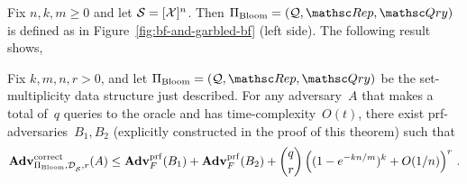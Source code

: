 Fix $n,k,m \geq 0$ and let $\mathcal{S}=[{\cal X}]^n$.  Then $\Pi_{\mathrm{Bloom}}= (\calQ,\Rep, \Qry)$ is defined as in Figure~\ref{fig:bf-and-garbled-bf} (left side).  The following result shows,
\begin{theorem}\label{thm3}
Fix $k,m,n,r>0$, and let $\Pi_{\mathrm{Bloom}}= (\calQ,\Rep, \Qry)$ be the set-multiplicity data structure just described. For any adversary~$A$ that makes a total of~$q$ queries to the oracle and has time-complexity~$O(t)$, there exist prf-adversaries~$B_1,B_2$ (explicitly constructed in the proof of this theorem) such that
\[
\mathrm{\mathbf{Adv}}^{\mathrm{correct}}_{\Pi_{\mathrm{Bloom}},\mathcal{D}_{{\cal S}}^{},r}(A) \leq  \mathbf{Adv}^{\mathrm{prf}}_{F}(B_1) + \mathbf{Adv}^{\mathrm{prf}}_{F}(B_2)  +{\dbinom{q}{r}} \left( (1-e^{-kn/m})^k + O(1/n) \right)^r\,.
\]
\end{theorem}


